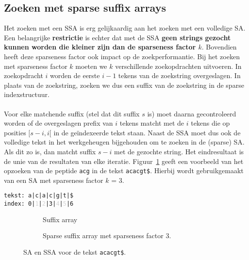 \subsection{Zoeken met sparse suffix arrays}\label{subsec:zoeken-in-sparse-suffix-arrays}
Het zoeken met een SSA is erg gelijkaardig aan het zoeken met een volledige SA\@.
Een belangrijke \textbf{restrictie} is echter dat met de SSA \textbf{geen strings gezocht kunnen worden die kleiner zijn dan de sparseness factor $k$}.
Bovendien heeft deze sparseness factor ook impact op de zoekperformantie.
Bij het zoeken met sparseness factor $k$ moeten we $k$ verschillende zoekopdrachten uitvoeren.
In zoekopdracht $i$ worden de eerste $i - 1$ tekens van de zoekstring overgeslagen.
In plaats van de zoekstring, zoeken we dus een suffix van de zoekstring in de sparse indexstructuur.
\\ \\
Voor elke matchende suffix (stel dat dit suffix $s$ is) moet daarna gecontroleerd worden of de overgeslagen prefix van $i$ tekens matcht met de $i$ tekens die op posities $[s - i, i[$ in de geïndexeerde tekst staan.
Naast de SSA moet dus ook de volledige tekst in het werkgeheugen bijgehouden om te zoeken in de (sparse) SA\@.
Als dit zo is, dan matcht suffix $s - i$ met de gezochte string.
Het eindresultaat is de unie van de resultaten van elke iteratie.
Figuur~\ref{fig:sparse_sa} geeft een voorbeeld van het opzoeken van de peptide \texttt{acg} in de tekst \texttt{acacgt\$}.
Hierbij wordt gebruikgemaakt van een SA met sparseness factor $k$ = 3.

\begin{center}
    \texttt{tekst: a|c|a|c|g|t|\$\\index: 0|\textcolor{lightgrey}{1}|\textcolor{lightgrey}{2}|3|\textcolor{lightgrey}{4}|\textcolor{lightgrey}{5}|6}
\end{center}
\begin{figure}[H]
    \hfill
    \begin{subfigure}[t]{0.45\linewidth}
        \centering
        \caption{Suffix array}
    \end{subfigure}
    \hfill
    \begin{subfigure}[t]{0.45\linewidth}
        \centering
        \caption{Sparse suffix array met sparseness factor 3.}
    \end{subfigure}
    \hfill
    \caption{SA en SSA voor de tekst \texttt{acacgt\$}.}
    \label{fig:sparse_sa}
\end{figure}

